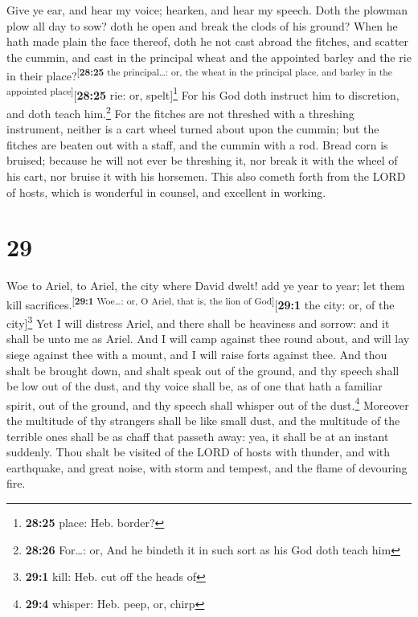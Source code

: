  Give ye ear, and hear my voice; hearken, and hear my
speech.  Doth the plowman plow all day to sow? doth he
open and break the clods of his ground?  When he hath
made plain the face thereof, doth he not cast abroad the fitches, and
scatter the cummin, and cast in the principal wheat and the appointed
barley and the rie in their place?\textsuperscript{{[}\textbf{28:25} the
principal\ldots: or, the wheat in the principal place, and barley in the
appointed place{]}}{[}\textbf{28:25} rie: or, spelt{]}\footnote{\textbf{28:25}
  place: Heb. border?}  For his God doth instruct him to
discretion, and doth teach him.\footnote{\textbf{28:26} For\ldots: or,
  And he bindeth it in such sort as his God doth teach him}
 For the fitches are not threshed with a threshing
instrument, neither is a cart wheel turned about upon the cummin; but
the fitches are beaten out with a staff, and the cummin with a rod.
 Bread corn is bruised; because he will not ever be
threshing it, nor break it with the wheel of his cart, nor bruise it
with his horsemen.  This also cometh forth from the LORD
of hosts, which is wonderful in counsel, and excellent in working.

\hypertarget{section-28}{%
\section{29}\label{section-28}}

 Woe to Ariel, to Ariel, the city where David dwelt! add
ye year to year; let them kill
sacrifices.\textsuperscript{{[}\textbf{29:1} Woe\ldots: or, O Ariel,
that is, the lion of God{]}}{[}\textbf{29:1} the city: or, of the
city{]}\footnote{\textbf{29:1} kill: Heb. cut off the heads of}
 Yet I will distress Ariel, and there shall be heaviness
and sorrow: and it shall be unto me as Ariel.  And I will
camp against thee round about, and will lay siege against thee with a
mount, and I will raise forts against thee.  And thou
shalt be brought down, and shalt speak out of the ground, and thy speech
shall be low out of the dust, and thy voice shall be, as of one that
hath a familiar spirit, out of the ground, and thy speech shall whisper
out of the dust.\footnote{\textbf{29:4} whisper: Heb. peep, or, chirp}
 Moreover the multitude of thy strangers shall be like
small dust, and the multitude of the terrible ones shall be as chaff
that passeth away: yea, it shall be at an instant suddenly.
 Thou shalt be visited of the LORD of hosts with thunder,
and with earthquake, and great noise, with storm and tempest, and the
flame of devouring fire.

